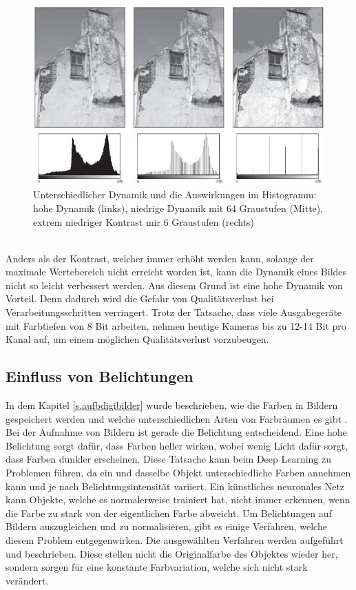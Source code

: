  \begin{figure}
    [h]
    \centering
    \includegraphics[scale=0.7]{Sources/dynamik.JPG}
    \caption{Unterschiedlicher Dynamik und die Auswirkungen im Histogramm: hohe Dynamik (links), niedrige Dynamik mit 64 Graustufen (Mitte), extrem niedriger Kontrast mir 6 Graustufen (rechts)\cite[45]{burger2009digitale}}
    \label{img:dynamik}
  \end{figure}\\
Anders als der Kontrast, welcher immer erhöht werden kann, solange der maximale Wertebereich nicht erreicht worden ist, kann die Dynamik eines Bildes nicht so leicht verbessert werden. Aus diesem Grund ist eine hohe Dynamik von Vorteil. Denn dadurch wird die Gefahr von Qualitätsverlust bei Verarbeitungsschritten verringert. Trotz der Tatsache, dass viele Ausgabegeräte mit Farbtiefen von 8 Bit arbeiten, nehmen heutige Kameras bis zu 12-14 Bit pro Kanal auf, um einem möglichen Qualitätsverlust vorzubeugen.
\subsection{Einfluss von Belichtungen}\label{s.belichtung}
In dem Kapitel \ref{s.aufbdigibilder} wurde beschrieben, wie die Farben in Bildern gespeichert werden und welche unterschiedlichen Arten von Farbräumen es gibt \cite[41ff.]{burger2009digitale}. Bei der Aufnahme von Bildern ist gerade die Belichtung entscheidend. Eine hohe Belichtung sorgt dafür, dass Farben heller wirken, wobei wenig Licht dafür sorgt, dass Farben dunkler erscheinen. Diese Tatsache kann beim Deep Learning zu Problemen führen, da ein und dasselbe Objekt unterschiedliche Farben annehmen kann und je nach Belichtungsintensität variiert. Ein künstliches neuronales Netz kann Objekte, welche es normalerweise trainiert hat, nicht immer erkennen, wenn die Farbe zu stark von der eigentlichen Farbe abweicht. Um Belichtungen auf Bildern auszugleichen und zu normalisieren, gibt es einige Verfahren, welche diesem Problem entgegenwirken. Die ausgewählten Verfahren werden aufgeführt und beschrieben. Diese stellen nicht die Originalfarbe des Objektes wieder her, sondern sorgen für eine konstante Farbvariation, welche sich nicht stark verändert.
